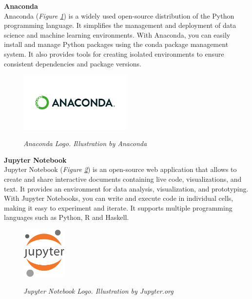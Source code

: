 \vspace{0.5cm}
\textbf{Anaconda} \\

Anaconda (\textit{Figure \ref{fig:anaconda-logo}}) is a widely used open-source distribution of the Python programming language. It simplifies the management and deployment of data science and machine learning environments. With Anaconda, you can easily install and manage Python packages using the conda package management system. It also provides tools for creating isolated environments to ensure consistent dependencies and package versions.

\begin{figure}[H]
\centering
  \begin{adjustbox}{trim=0cm 1cm 0cm 1cm, clip}
\includegraphics[width=0.5\textwidth]{imatges/studies_and_decisions/anaconda-logo.png}
\end{adjustbox}
\caption[Anaconda Logo]{\textit{Anaconda Logo. Illustration by Anaconda}}
{\label{fig:anaconda-logo}}
\end{figure}


\vspace{0.5cm}
\textbf{Jupyter Notebook} \\

Jupyter Notebook (\textit{Figure \ref{fig:jupyter-logo}}) is an open-source web application that allows to create and share interactive documents containing live code, visualizations, and text. It provides an environment for data analysis, visualization, and prototyping. With Jupyter Notebooks, you can write and execute code in individual cells, making it easy to experiment and iterate. It supports multiple programming languages such as Python, R and Haskell.

\begin{figure}[H]
\centering
\includegraphics[width=0.2\textwidth]{imatges/studies_and_decisions/jupyter-notebook.png}
\caption[Jupyter Notebook Logo]{\textit{Jupyter Notebook Logo. Illustration by Jupyter.org}}
{\label{fig:jupyter-logo}}
\end{figure}

